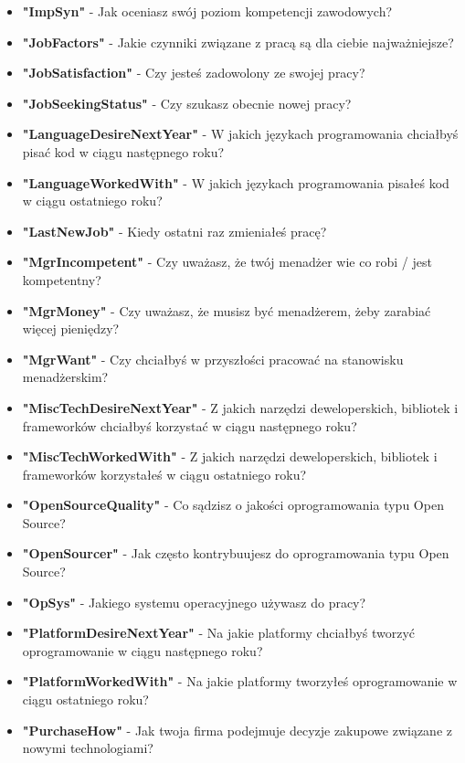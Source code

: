 \begin{appendices}
\begin{itemize}
        \item \textbf{"ImpSyn"} - Jak oceniasz swój poziom kompetencji zawodowych?
        \item \textbf{"JobFactors"} - Jakie czynniki związane z pracą są dla ciebie najważniejsze?
        \item \textbf{"JobSatisfaction"} - Czy jesteś zadowolony ze swojej pracy?
        \item \textbf{"JobSeekingStatus"} - Czy szukasz obecnie nowej pracy?
        \item \textbf{"LanguageDesireNextYear"} - W jakich językach programowania chciałbyś pisać kod w ciągu następnego roku?
        \item \textbf{"LanguageWorkedWith"} - W jakich językach programowania pisałeś kod w ciągu ostatniego roku?
        \item \textbf{"LastNewJob"} - Kiedy ostatni raz zmieniałeś pracę?
        \item \textbf{"MgrIncompetent"} - Czy uważasz, że twój menadżer wie co robi / jest kompetentny?
        \item \textbf{"MgrMoney"} - Czy uważasz, że musisz być menadżerem, żeby zarabiać więcej pieniędzy?
        \item \textbf{"MgrWant"} - Czy chciałbyś w przyszłości pracować na stanowisku menadżerskim?
        \item \textbf{"MiscTechDesireNextYear"} - Z jakich narzędzi deweloperskich, bibliotek i frameworków chciałbyś korzystać w ciągu następnego roku?
        \item \textbf{"MiscTechWorkedWith"} - Z jakich narzędzi deweloperskich, bibliotek i frameworków korzystałeś w ciągu ostatniego roku?
        \item \textbf{"OpenSourceQuality"} - Co sądzisz o jakości oprogramowania typu Open Source?
        \item \textbf{"OpenSourcer"} - Jak często kontrybuujesz do oprogramowania typu Open Source?
        \item \textbf{"OpSys"} - Jakiego systemu operacyjnego używasz do pracy?
        \item \textbf{"PlatformDesireNextYear"} - Na jakie platformy chciałbyś tworzyć oprogramowanie w ciągu następnego roku?
        \item \textbf{"PlatformWorkedWith"} - Na jakie platformy tworzyłeś oprogramowanie w ciągu ostatniego roku?
        \item \textbf{"PurchaseHow"} - Jak twoja firma podejmuje decyzje zakupowe związane z nowymi technologiami?

\end{itemize}
\end{appendices}
